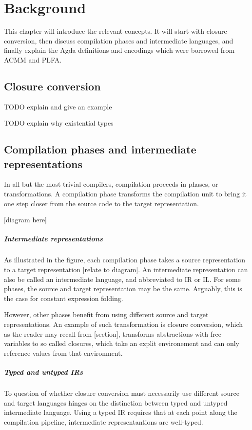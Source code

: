 \documentclass[bsc,frontabs,twoside,singlespacing,parskip,deptreport]{infthesis}
\theoremstyle{definition}
\begin{document}
\chapter{Background}

This chapter will introduce the relevant concepts. It will start with
closure conversion, then discuss compilation phases and intermediate
languages, and finally explain the Agda definitions and encodings
which were borrowed from ACMM and PLFA.

\section{Closure conversion}

TODO explain and give an example

TODO explain why existential types

\section{Compilation phases and intermediate representations}

In all but the most trivial compilers, compilation proceeds in
phases, or transformations. A compilation phase transforms the
compilation unit to bring it one step closer from the source code to
the target representation.

[diagram here]

\paragraph{Intermediate representations} As illustrated in the figure,
each compilation phase takes a source representation to a target
representation [relate to diagram]. An intermediate representation can
also be called an intermediate language, and abbreviated to IR or
IL. For some phases, the source and target representation may be the
same. Arguably, this is the case for constant expression folding.

However, other phases benefit from using different source and target
representations. An example of such transformation is closure
conversion, which as the reader may recall from [section], transforms
abstractions with free variables to so called closures, which take an
explit environement and can only reference values from that
environment.

\paragraph{Typed and untyped IRs} To question of whether closure
conversion must necessarily use different source and target languages
hinges on the distinction between typed and untyped intermediate
language. Using a typed IR requires that at each point along the
compilation pipeline, intermediate representantions are well-typed.
\end{document}
